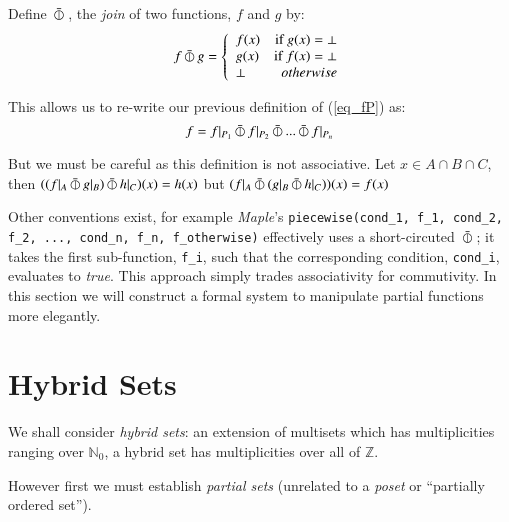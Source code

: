 \begin{definition}
	Define $\,\bar{\varobar}\,$, the \emph{join} of two functions, $f$ and $g$ by:
	\begin{equation}
	\label{def:fjoin}
		f \,\bar{\varobar}\, g =  
		\left\{
	     		\begin{array}{lr}
	       		f(x) & \text{if } g(x) = \bot \\
	       		g(x) & \text{if } f(x) = \bot \\
	       		\bot & otherwise
	     		\end{array}
	   	\right.
	\end{equation}
\end{definition}


This allows us to re-write our previous definition of (\ref{eq_fP}) as:
\begin{equation}
	f = f|_{P_1} \,\bar{\varobar}\, f|_{P_2} \,\bar{\varobar}\, ... \,\bar{\varobar}\, f|_{P_n}
\end{equation}


But we must be careful as this definition is not associative.
Let $x \in A \cap B \cap C$, 
then $( (f|_{A} \,\bar{\varobar}\, g|_{B} ) \,\bar{\varobar}\, h|_{C} )(x) = h(x)$ 
but $( f|_{A} \,\bar{\varobar}\, ( g|_{B} \,\bar{\varobar}\, h|_{C} ))(x) = f(x)$


Other conventions exist, for example \emph{Maple}'s 
\texttt{piecewise(cond\_1, f\_1, cond\_2, f\_2, ..., cond\_n, f\_n, f\_otherwise)} 
effectively uses a short-circuted $\,\bar{\varobar}\,$;
it takes the first sub-function, \texttt{f\_i}, such that the corresponding condition, \texttt{cond\_i}, evaluates to \emph{true}.
This approach simply trades associativity for commutivity.
In this section we will construct a formal system to manipulate partial functions more elegantly.




%
%
\section{Hybrid Sets}


We shall consider \emph{hybrid sets}: 
an extension of multisets which has multiplicities ranging over $\mathbb{N}_0$, 
a hybrid set has multiplicities over all of $\mathbb{Z}$.

However first we must establish \emph{partial sets} (unrelated to a \emph{poset} or ``partially ordered set'').

